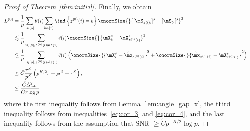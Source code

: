 \documentclass[lettersize,onecolumn,journal]{IEEEtran}
\theoremstyle{definition}
\theoremstyle{definition}
\newcommand{\of}[1]{\left(#1\right)}
\newcommand{\offf}[1]{\left\{#1\right\}}
\begin{document}
\begin{proof}[Proof of Theorem~\ref{thm:initial}]
Finally, we obtain 
\begin{align}
     L^{(0)} &= \frac{1}{p}  \sum_{i \in [p]} \theta(i) \sum_{b \in [r]}  \ind \offf{ z^{(0)}(i) = b } \onormSize{}{ [ \mS_{  z(i):}  ]^s - [ \mS_{b:}  ]^s  }^2 \\
     & \lesssim \frac{1}{p}  \sum_{i \in [p], z^{(0)}(i) \neq z(i)} \theta(i)  \onormSize{}{ \mX_{i:}^s -  \mX_{z^{(0)}(i)}^s  }^2\\
     & \lesssim \frac{1}{p}  \sum_{i \in [p], z^{(0)}(i) \neq z(i)} \theta(i) \of{ \onormSize{}{\mX_{i:}^s - \hat \mx_{z^{(0)}(i)}}^2 + \onormSize{}{ \hat \mx_{z^{(0)}(i)} - \mX_{z^{(0)}(i)}^s  }^2 } \\
     & \leq \bar C \frac{r^{K}}{p^{K}} \of{ p^{K/2}r + pr^2 + r^K}, \\
     & \leq \frac{\bar C\Delta_{\min}^2}{ \tilde C r \log p}
\end{align}
where the first inequality follows from Lemma~\ref{lem:angle_gap_x}, the third inequality follows from inequalities~\eqref{eq:cor_3} and \eqref{eq:cor_4}, and the last inequality follows from the assumption that SNR $\geq \tilde C p^{-K/2} \log p$.
    
    
\end{proof}
\end{document}
